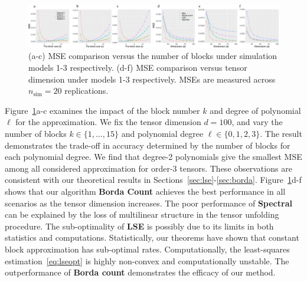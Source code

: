 \documentclass{article}
\theoremstyle{definition}
\begin{document}

\vspace{-.3cm}
\begin{figure}[htp]
    \centering
    \includegraphics[width =\textwidth]{figures/sim2.pdf}    
    \caption{(a-c) MSE comparison versus the number of blocks under simulation models 1-3 respectively. (d-f) MSE comparison versus tensor dimension under models 1-3 respectively. MSEs are measured across $n_{\text{sim}} = 20$ replications.}
    \label{fig:degk}
    \vspace{-.3cm}
\end{figure}

Figure~\ref{fig:degk}a-c examines the impact of the block number $k$ and degree of polynomial $\ell$ for the approximation. We fix the tensor dimension $d = 100$, and vary the number of blocks $k\in\{1,\ldots,15\}$ and polynomial degree $\ell\in\{0,1,2,3\}.$ The result demonstrates the trade-off in accuracy determined by the number of blocks for each polynomial degree. We find that degree-2 polynomials give the smallest MSE among all considered approximation for order-3 tensors. These observations are consistent with our theoretical results in Sections~\ref{sec:lse}-\ref{sec:borda}. Figure~\ref{fig:degk}d-f shows that our algorithm {\bf \small Borda Count} achieves the best performance in all scenarios as the tensor dimension increases. The poor performance of {\bf \small Spectral} can be explained by the loss of multilinear structure in the tensor unfolding procedure. The sub-optimality of {\bf \small LSE} is possibly due to its limits in both statistics and computations. Statistically, our theorems have shown that constant block approximation has sub-optimal rates. Computationally, the least-squares estimation~\eqref{eq:lseopt} is highly non-convex and computationally unstable. The outperformance of {\bf \small Borda count} demonstrates the efficacy of our method.
\end{document}
